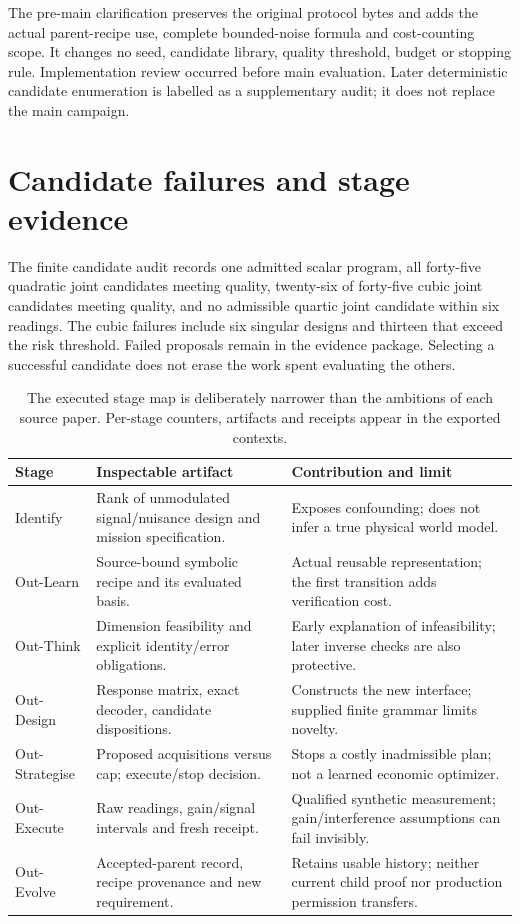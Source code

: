 \documentclass[11pt]{article}
\begin{document}
The pre-main clarification preserves the original protocol bytes and adds the actual parent-recipe use, complete bounded-noise formula and cost-counting scope. It changes no seed, candidate library, quality threshold, budget or stopping rule. Implementation review occurred before main evaluation. Later deterministic candidate enumeration is labelled as a supplementary audit; it does not replace the main campaign.

\section{Candidate failures and stage evidence}

The finite candidate audit records one admitted scalar program, all forty-five quadratic joint candidates meeting quality, twenty-six of forty-five cubic joint candidates meeting quality, and no admissible quartic joint candidate within six readings. The cubic failures include six singular designs and thirteen that exceed the risk threshold. Failed proposals remain in the evidence package. Selecting a successful candidate does not erase the work spent evaluating the others.

\begin{table}[htbp]
\centering\small
\begin{tabularx}{\linewidth}{P{.19\linewidth}Y Y}
\toprule
\textbf{Stage} & \textbf{Inspectable artifact} & \textbf{Contribution and limit}\\
\midrule
Identify & Rank of unmodulated signal/nuisance design and mission specification. & Exposes confounding; does not infer a true physical world model.\\
Out-Learn & Source-bound symbolic recipe and its evaluated basis. & Actual reusable representation; the first transition adds verification cost.\\
Out-Think & Dimension feasibility and explicit identity/error obligations. & Early explanation of infeasibility; later inverse checks are also protective.\\
Out-Design & Response matrix, exact decoder, candidate dispositions. & Constructs the new interface; supplied finite grammar limits novelty.\\
Out-Strategise & Proposed acquisitions versus cap; execute/stop decision. & Stops a costly inadmissible plan; not a learned economic optimizer.\\
Out-Execute & Raw readings, gain/signal intervals and fresh receipt. & Qualified synthetic measurement; gain/interference assumptions can fail invisibly.\\
Out-Evolve & Accepted-parent record, recipe provenance and new requirement. & Retains usable history; neither current child proof nor production permission transfers.\\
\bottomrule
\end{tabularx}
\caption{The executed stage map is deliberately narrower than the ambitions of each source paper. Per-stage counters, artifacts and receipts appear in the exported contexts.}
\end{table}
\end{document}
